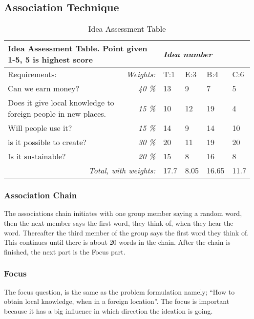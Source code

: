 \subsection{Association Technique}

\begin{table*}[t!]
\centering
\caption{Idea Assessment Table}
\label{tab:iass}
\begin{tabular}{|l|r|l|l|l|l|}
\hline
\multicolumn{2}{|l|}{\textbf{Idea Assessment Table. Point given 1-5, 5 is highest score}} & \multicolumn{4}{l|}{\textit{Idea number}} \\ \hline
Requirements: & \multicolumn{1}{l|}{\textit{Weights:}} & T:1 & E:3 & B:4 & C:6 \\ \hline
Can we earn money? & \textit{40 \%} & 13 & 9 & 7 & 5 \\ \hline
Does it give local knowledge to foreign people in new places. & \textit{15 \%} & 10 & 12 & 19 & 4 \\ \hline
Will people use it? & \textit{15 \%} & 14 & 9 & 14 & 10 \\ \hline
is it possible to create? & \textit{30 \%} & 20 & 11 & 19 & 20 \\ \hline
Is it sustainable? & \textit{20 \%} & 15 & 8 & 16 & 8 \\ \hline
\multicolumn{2}{|r|}{\textit{Total, with weights:}} & \cellcolor[HTML]{34FF34}17.7 & \cellcolor[HTML]{FE0000}8.05 & \cellcolor[HTML]{F56B00}16.65 & \cellcolor[HTML]{FE0000}11.7 \\ \hline
\end{tabular}
\end{table*}

\subsubsection{Association Chain}
The associations chain initiates with one group member saying a random word, then the next member says the first word, they think of, when they hear the word. Thereafter the third member of the group says the first word they think of. This continues until there is about 20 words in the chain. After the chain is finished, the next part is the Focus part.

\subsubsection{Focus}
The focus question, is the same as the problem formulation namely; “How to obtain local knowledge, when in a foreign location”. The focus is important because it has a big influence in which direction the ideation is going. 

